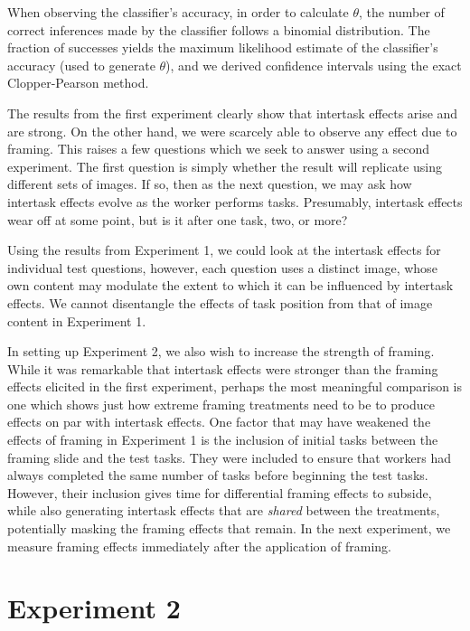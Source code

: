 \documentclass{sigchi}
\begin{document}
When observing the classifier's accuracy, in order to calculate $\theta$,
the number of correct inferences made by the classifier follows a binomial 
distribution.  The fraction of successes yields the maximum likelihood
estimate of the classifier's accuracy (used to generate $\theta$), 
and we derived confidence intervals using the exact Clopper-Pearson method.

The results from the first experiment clearly show that intertask effects 
arise and are strong.  On the other hand, we were scarcely able to observe
any effect due to framing.  This raises a few questions which we seek
to answer using a second experiment.  The first question is simply whether
the result will replicate using different sets of images.  
If so, then as the next question, we may ask how intertask effects evolve
as the worker performs tasks.  Presumably, intertask effects wear off at 
some point, but is it after one task, two, or more?  

Using the results from Experiment 1, 
we could look at the intertask effects for individual test questions, 
however, each question uses a distinct image, whose own content may
modulate the extent to which it can be influenced by intertask effects.
We cannot disentangle the effects of task position from that of image 
content in Experiment 1.

In setting up Experiment 2, we also wish to increase the strength of 
framing.  While it was remarkable that intertask effects were stronger 
than the framing effects elicited in the first experiment, perhaps the 
most meaningful comparison is one which shows just how extreme framing 
treatments need to be to produce effects on par with intertask effects.  
One factor that may have weakened the effects of framing in Experiment 1 
is the inclusion of initial tasks between the framing slide and the test 
tasks. They were included to ensure that workers had always completed the
same number of tasks before beginning the test tasks.  However, their 
inclusion gives time for differential framing effects to 
subside, while also generating intertask effects that are 
\textit{shared} between the treatments, potentially masking the framing 
effects that remain.  In the next experiment, we measure framing effects 
immediately after the application of framing.

\pagebreak
\section{Experiment 2}
\end{document}
